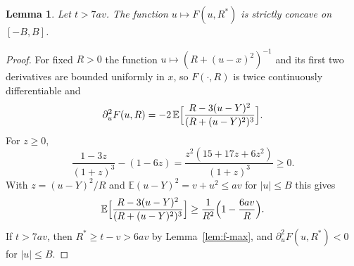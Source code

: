 \documentclass[11pt]{amsart}
\newtheorem{lemma}[theorem]{Lemma}
\theoremstyle{definition}
\newcommand{\E}{\mathbb{E}}
\begin{document}
\begin{lemma}\label{lem:f-concave}
Let $t>7av$. The function $u\mapsto F(u,R^*)$ is strictly concave on $[-B,B]$.
\end{lemma}

\begin{proof}
For fixed $R>0$ the function $u\mapsto(R+(u-x)^2)^{-1}$ and its first two derivatives are bounded uniformly in $x$,
so $F(\cdot,R)$ is twice continuously differentiable and
\[
\partial_u^2F(u,R)=-2\,\E\Bigl[\frac{R-3(u-Y)^2}{(R+(u-Y)^2)^3}\Bigr].
\]
For $z\ge0$,
\[
\frac{1-3z}{(1+z)^3}-(1-6z)=\frac{z^2(15+17z+6z^2)}{(1+z)^3}\ge0 .
\]
With $z=(u-Y)^2/R$ and $\E(u-Y)^2=v+u^2\le av$ for $|u|\le B$ this gives
\[
\E\Bigl[\frac{R-3(u-Y)^2}{(R+(u-Y)^2)^3}\Bigr]\ge\frac1{R^2}\Bigl(1-\frac{6av}{R}\Bigr).
\]
If $t>7av$, then $R^*\ge t-v>6av$ by Lemma~\ref{lem:f-max}, and $\partial_u^2F(u,R^*)<0$ for $|u|\le B$.
\end{proof}
\end{document}
